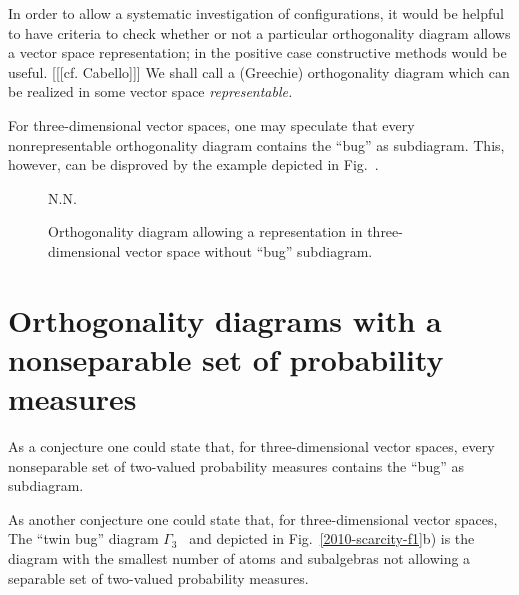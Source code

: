 \documentclass[pra,amsfonts,showpacs,showkeys,preprint]{revtex4}%
\begin{document}
In order to allow a systematic investigation of configurations, it would be helpful to have criteria
to check whether or not a particular  orthogonality diagram allows a vector space representation;
in the positive case constructive methods would be useful.
[[[cf. Cabello]]]
We shall call a (Greechie) orthogonality diagram which can be realized in some vector space {\em representable.}

For three-dimensional vector spaces, one may speculate that every nonrepresentable orthogonality diagram contains the ``bug'' as subdiagram.
This, however, can be disproved by the example depicted in Fig.~\cite{2010-scarcity-f-nonbug}.

\begin{figure}%
\begin{center}
N.N.
\end{center}
\caption{Orthogonality diagram allowing a representation in three-dimensional vector space without ``bug'' subdiagram.
\label{2010-scarcity-f-nonbug} }
\end{figure}

\section{Orthogonality diagrams with a nonseparable set of probability measures}



As a conjecture one could state that, for three-dimensional vector spaces, every nonseparable set of two-valued probability measures contains the ``bug'' as subdiagram.


As another conjecture one could state that, for three-dimensional vector spaces, The ``twin bug'' diagram $\Gamma_3$~\cite{kochen1}
and depicted in Fig.~\ref{2010-scarcity-f1}b) is the diagram with the smallest number of atoms and subalgebras not allowing a separable set of two-valued probability measures.



\end{document}
